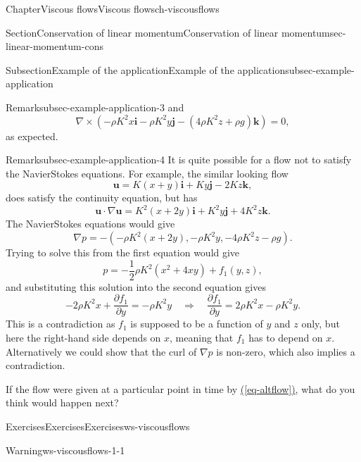 \documentclass[oneside,10pt,]{book}
\newcommand{\xreffont}{\relax}
\numberwithin{equation}{section}
\newcommand{\pd}[2]{\frac{\partial#1}{\partial#2}}
\newcommand{\bu}{\boldsymbol{u}}
\newcommand{\bi}{\boldsymbol{i}}
\newcommand{\bj}{\boldsymbol{j}}
\newcommand{\bk}{\boldsymbol{k}}
\begin{document}
\begin{chapterptx}{Chapter}{Viscous flows}{}{Viscous flows}{}{}{ch-viscousflows}
\begin{sectionptx}{Section}{Conservation of linear momentum}{}{Conservation of linear momentum}{}{}{sec-linear-momentum-cons}
\begin{subsectionptx}{Subsection}{Example of the application}{}{Example of the application}{}{}{subsec-example-application}
\begin{remark}{Remark}{}{subsec-example-application-3}
and%
\begin{equation*}
\nabla\times\left(-\rho K^2x\bi-\rho K^2y\bj
-(4\rho K^2z+\rho g)\bk\right)=0,
\end{equation*}
as expected.%
\end{remark}
\begin{remark}{Remark}{}{subsec-example-application-4}%
It is quite possible for a flow not to satisfy the Navier\textendash{}Stokes equations. For example, the similar looking flow%
\begin{equation}
\bu=K(x+y)\bi+Ky\bj-2Kz\bk,\label{eq-altflow}
\end{equation}
does satisfy the continuity equation, but has%
\begin{equation*}
\bu\cdot\nabla\bu=K^2(x+2y)\bi+K^2y\bj+4K^2z\bk.
\end{equation*}
The Navier\textendash{}Stokes equations would give%
\begin{equation*}
\nabla p=-\left(-\rho K^2(x+2y),-\rho K^2y,-4\rho K^2z-\rho g\right).
\end{equation*}
Trying to solve this from the first equation would give%
\begin{equation*}
p=-\frac12\rho K^2(x^2+4xy)+f_1(y,z),
\end{equation*}
and substituting this solution into the second equation gives%
\begin{equation*}
-2\rho K^2x+\pd{f_1}{y}=-\rho K^2y\quad\Rightarrow\quad
\pd{f_1}{y}=2\rho K^2x-\rho K^2y.
\end{equation*}
This is a contradiction as \(f_1\) is supposed to be a function of \(y\) and \(z\) only, but here the right-hand side depends on \(x\), meaning that \(f_1\) has to depend on \(x\). Alternatively we could show that the curl of \(\nabla p\) is non-zero, which also implies a contradiction.%
\par
If the flow were given at a particular point in time by \hyperref[eq-altflow]{({\xreffont\ref{eq-altflow}})}, what do you think would happen next?%
\end{remark}
\end{subsectionptx}
\end{sectionptx}
%
%
\typeout{************************************************}
\typeout{************************************************}
%
\begin{exercises-section}{Exercises}{Exercises}{}{Exercises}{}{}{ws-viscousflows}
\begin{introduction}{}%
\begin{warning}{Warning}{}{ws-viscousflows-1-1}%

\end{warning}
\end{introduction}
\end{exercises-section}
\end{chapterptx}
\end{document}
